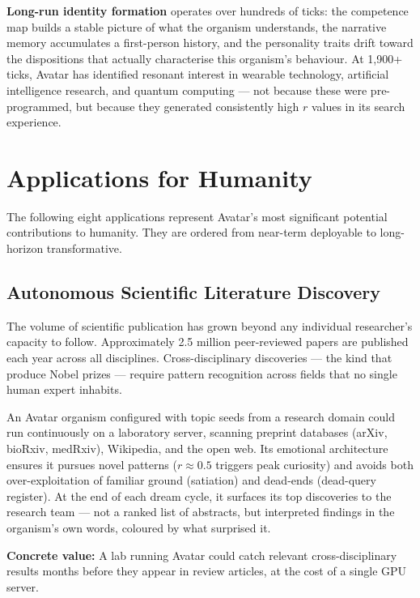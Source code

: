 \documentclass[11pt,a4paper]{article}
\begin{document}
\textbf{Long-run identity formation} operates over hundreds of ticks: the competence
map builds a stable picture of what the organism understands, the narrative memory
accumulates a first-person history, and the personality traits drift toward the
dispositions that actually characterise this organism's behaviour. At 1,900+ ticks, Avatar
has identified resonant interest in wearable technology, artificial intelligence
research, and quantum computing --- not because these were pre-programmed, but because
they generated consistently high $r$ values in its search experience.

\section{Applications for Humanity}

The following eight applications represent Avatar's most significant potential
contributions to humanity. They are ordered from near-term deployable to long-horizon
transformative.

\subsection{Autonomous Scientific Literature Discovery}

The volume of scientific publication has grown beyond any individual researcher's
capacity to follow. Approximately 2.5 million peer-reviewed papers are published each
year across all disciplines. Cross-disciplinary discoveries --- the kind that produce
Nobel prizes --- require pattern recognition across fields that no single human expert
inhabits.

\begin{tcolorbox}[application,title={Application 1: Continuous Literature Intelligence}]
An Avatar organism configured with topic seeds from a research domain could run
continuously on a laboratory server, scanning preprint databases (arXiv, bioRxiv,
medRxiv), Wikipedia, and the open web. Its emotional architecture ensures it pursues
novel patterns ($r \approx 0.5$ triggers peak curiosity) and avoids both
over-exploitation of familiar ground (satiation) and dead-ends (dead-query register).
At the end of each dream cycle, it surfaces its top discoveries to the research team ---
not a ranked list of abstracts, but interpreted findings in the organism's own words,
coloured by what surprised it.

\textbf{Concrete value:} A lab running Avatar could catch relevant cross-disciplinary
results months before they appear in review articles, at the cost of a single GPU
server.
\end{tcolorbox}
\end{document}
